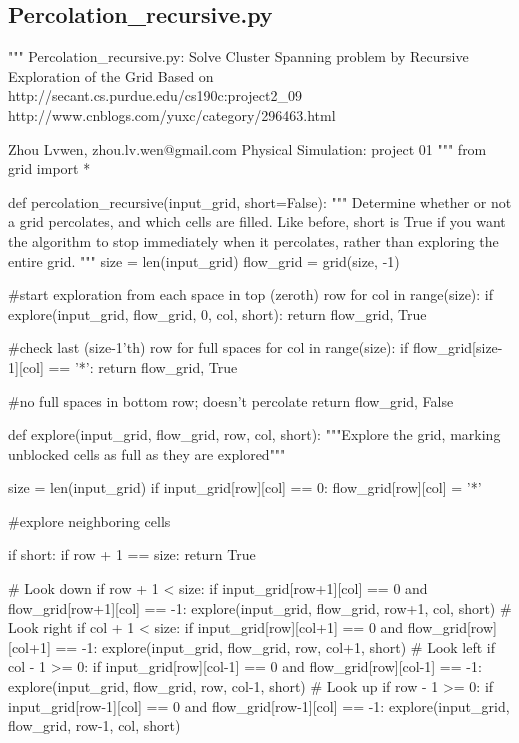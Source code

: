 \documentclass[11pt,a4paper,boxed]{caspset}
\begin{document}
\begin{subappendices}
\section{Percolation\_recursive.py}
\begin{python}
"""
Percolation_recursive.py: Solve Cluster Spanning problem by Recursive
                          Exploration of the Grid
Based on http://secant.cs.purdue.edu/cs190c:project2\_09
         http://www.cnblogs.com/yuxc/category/296463.html

Zhou Lvwen, zhou.lv.wen@gmail.com
Physical Simulation: project 01
"""
from grid import *

def percolation_recursive(input_grid, short=False):
    """
    Determine whether or not a grid percolates, and which cells are filled.
    Like before, short is True if you want the algorithm to stop immediately
    when it percolates, rather than exploring the entire grid.
    """
    size = len(input_grid)
    flow_grid = grid(size, -1)

    #start exploration from each space in top (zeroth) row
    for col in range(size):
        if explore(input_grid, flow_grid, 0, col, short):
            return flow_grid, True

    #check last (size-1'th) row for full spaces
    for col in range(size):
        if flow_grid[size-1][col] == '*':
            return flow_grid, True

    #no full spaces in bottom row; doesn't percolate
    return flow_grid, False

def explore(input_grid, flow_grid, row, col, short):
    """Explore the grid, marking unblocked cells as full as they are
       explored"""

    size = len(input_grid)
    if input_grid[row][col] == 0:
        flow_grid[row][col] = '*'

        #explore neighboring cells

        if short:
            if row + 1 == size:
                return True

        # Look down
        if row + 1 < size:
            if input_grid[row+1][col] == 0 and flow_grid[row+1][col] == -1:
               explore(input_grid, flow_grid, row+1, col, short)
        # Look right
        if col + 1 < size:
            if input_grid[row][col+1] == 0 and flow_grid[row][col+1] == -1:
               explore(input_grid, flow_grid, row, col+1, short)
        # Look left
        if col - 1 >= 0:
            if input_grid[row][col-1] == 0 and flow_grid[row][col-1] == -1:
               explore(input_grid, flow_grid, row, col-1, short)
        # Look up
        if row - 1 >= 0:
            if input_grid[row-1][col] == 0 and flow_grid[row-1][col] == -1:
               explore(input_grid, flow_grid, row-1, col, short)
\end{python}


\end{subappendices}
\end{document}
